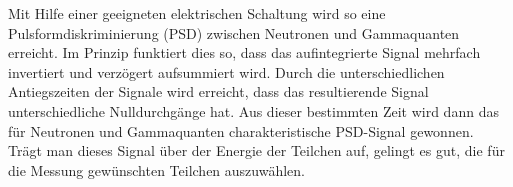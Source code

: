 Mit Hilfe einer geeigneten elektrischen Schaltung wird so eine Pulsformdiskriminierung (PSD) zwischen Neutronen und Gammaquanten erreicht. Im Prinzip funktiert dies so, dass das aufintegrierte Signal mehrfach invertiert und verzögert aufsummiert wird. Durch die unterschiedlichen Antiegszeiten der Signale wird erreicht, dass das resultierende Signal unterschiedliche Nulldurchgänge hat. Aus dieser bestimmten Zeit wird dann das für Neutronen und Gammaquanten charakteristische PSD-Signal gewonnen. Trägt man dieses Signal über der Energie der Teilchen auf, gelingt es gut, die für die Messung gewünschten Teilchen auszuwählen.



